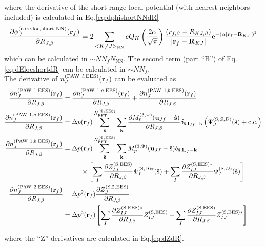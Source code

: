 \documentclass[paper=a4, fontsize=11pt]{article} %
\numberwithin{equation}{section} %
\numberwithin{figure}{section} %
\numberwithin{table}{section} %
\newcommand{\p}{\partial}
\newcommand{\bu}{{\bf{u}}}
\newcommand{\bl}{{\bf{l}}}
\newcommand{\bk}{{\bf{k}}}
\newcommand{\bs}{{\bf{s}}}
\newcommand{\br}{{\bf{r}}}
\newcommand{\bR}{{\bf{R}}}
\newcommand{\hs}{{\hat{\bf{s}}}}
\newcommand{\rS}{{\mathrm{S}}}
\newcommand{\rEES}{{\mathrm{EES}}}
\newcommand{\rcore}{{\mathrm{core}}}
\newcommand{\rNN}{{\mathrm{NN}}}
\newcommand{\re}{{\mathrm{e}}}
\newcommand{\rshort}{{\mathrm{short}}}
\newcommand{\rcc}{{\mathrm{c.c.}}}
\newcommand{\rP}{{\mathrm{PAW}}}
\newcommand{\rB}{{\mathrm{B}}}
\newcommand{\rD}{{\mathrm{D}}}
\newcommand{\rlo}{{\mathrm{loc}}}
\newcommand{\al}{{\alpha}}
\newcommand{\RJb}{{R_{J,\beta}}}
\newcommand{\NFFTpEES}{{N^{\mathrm{(\Psi,\rEES})}_{\mathrm{FFT}}}}
\newcommand{\Mp}{{M_p^{(3,\Psi)}}}
\begin{document}
where the derivative of the short range local potential (with nearest neighbors included) is calculated in Eq.\eqref{eq:dphishortNNdR}
\begin{equation}\label{eq:dphiNNJdR}
\frac{\p \phi_J^{(\rcore,\rlo,\rshort,\rNN)}(\br_f)}{\p \RJb}
= 2\sum_{<K\neq J>_{\rNN}}eQ_K \left(\frac{2\al}{\sqrt{\pi}} \right)\frac{\left(r_{f,\beta}-R_{KJ,\beta}\right)}{|\br_f-\bR_{KJ}|}\re^{-(\alpha|\br_f-\bR_{KJ}|)^2}\\
\end{equation}
which can be calculated in $\sim NN_fN_\rNN$. The second term (part ``$\rB$'') of Eq.\eqref{eq:dElocshortdR} can be calculated in $\sim NN_f$. \\

The derivative of $n_{J}^{(\rP\ l,\rEES)}(\br_f)$ can be evaluated as
\begin{equation} \label{eq:dnrfdR}
\begin{split}
\frac{\p n_{J}^{(\rP\ 1,\rEES)}(\br_f)}{\p \RJb}&=\frac{\p n_{J}^{(\rP\ 1,a,\rEES)}(\br_f)}{\p \RJb} + \frac{\p n_{J}^{(\rP\ 1,b,\rEES)}(\br_f)}{\p \RJb}\\
\frac{\p n_{J}^{(\rP\ 1,a,\rEES)}(\br_f)}{\p \RJb} 
&= \Delta p(\br_f)\sum_{\hat \bs}^{\NFFTpEES} \sum_{\bk} \frac{\p \Mp(\bu_{Jf}-\hat \bs)}{\p \RJb}\delta_{\hat \bs,\bl_{Jf}-\bk} \left(\Psi_J^{(\rS,Z,D)}(\hs)+ \rcc\right) \\
\frac{\p n_{J}^{(\rP\ 1,b,\rEES)}(\br_f)}{\p \RJb} 
&= \Delta p(\br_f)\sum_{\hat \bs}^{\NFFTpEES} \sum_{\bk} \Mp(\bu_{Jf}-\hat \bs)\delta_{\hat \bs,\bl_{Jf}-\bk} \\
&\ \ \ \ \ \ \ \ \times \left[\sum_I \frac{\p Z_{IJ}^{(\rS,\rEES)}}{\p \RJb}\Psi_I^{(\rS,\rD)*}(\hat \bs)+ \sum_I \frac{\p Z_{IJ}^{(\rS,\rEES)*}}{\p \RJb} \Psi_I^{(\rS,D)}(\hs)\right] \\
\frac{\p n_{J}^{(\rP\ 2,\rEES)}(\br_f)}{\p \RJb} 
&= \Delta p^2(\br_f) \frac{\p Z_{J}^{(\rS,2,\rEES)}}{\p \RJb}\\
&=\Delta p^2(\br_f)\left[ \sum_{I}\frac{\p Z_{IJ}^{(\rS,\rEES)*}}{\p \RJb} Z_{IJ}^{(\rS,\rEES)} + \sum_I \frac{\p Z_{IJ}^{(\rS,\rEES)}}{\p \RJb} Z_{IJ}^{(\rS,\rEES)*}\right]
\end{split}
\end{equation}

where the ``Z'' derivatives are calculated in Eq.\eqref{eq:dZdR}. 
\end{document}
